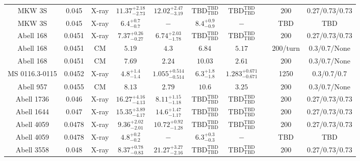 \begin{table}
\begin{tabular}{cccccccccc}
MKW 3S & 0.045 & X-ray & ${11.37}^{+2.18}_{-2.73}$ & ${12.02}^{+2.47}_{-3.19}$ & ${\mathrm{TBD}}^{\mathrm{TBD}}_{\mathrm{TBD}}$ & ${\mathrm{TBD}}^{\mathrm{TBD}}_{\mathrm{TBD}}$ & \citet{BA14.1} & 200 & 0.27/0.73/0.73 \\
MKW 3S & 0.045 & X-ray & ${6.4}^{+0.7}_{-0.7}$ & ${-}^{}_{}$ & ${8.4}^{+0.9}_{-0.9}$ & ${-}^{}_{}$ & \citet{XU01.1} & TBD & TBD \\
Abell 168 & 0.0451 & X-ray & ${7.37}^{+0.26}_{-0.27}$ & ${6.74}^{+2.03}_{-1.78}$ & ${\mathrm{TBD}}^{\mathrm{TBD}}_{\mathrm{TBD}}$ & ${\mathrm{TBD}}^{\mathrm{TBD}}_{\mathrm{TBD}}$ & \citet{BA14.1} & 200 & 0.27/0.73/0.73 \\
Abell 168 & 0.0451 & CM & ${5.19}^{}_{}$ & ${4.3}^{}_{}$ & ${6.84}^{}_{}$ & ${5.17}^{}_{}$ & \citet{RI03.1} & 200/turn & 0.3/0.7/None \\
Abell 168 & 0.0451 & CM & ${7.69}^{}_{}$ & ${2.24}^{}_{}$ & ${10.03}^{}_{}$ & ${2.61}^{}_{}$ & \citet{RI06.1} & 200 & 0.3/0.7/None \\
MS 0116.3-0115 & 0.0452 & X-ray & ${4.8}^{+1.4}_{-1.4}$ & ${1.055}^{+0.514}_{-0.514}$ & ${6.3}^{+1.8}_{-1.8}$ & ${1.283}^{+0.671}_{-0.671}$ & \citet{GA06.1} & 1250 & 0.3/0.7/0.7 \\
Abell 957 & 0.0455 & CM & ${8.13}^{}_{}$ & ${2.79}^{}_{}$ & ${10.6}^{}_{}$ & ${3.25}^{}_{}$ & \citet{RI06.1} & 200 & 0.3/0.7/None \\
Abell 1736 & 0.046 & X-ray & ${16.27}^{+4.16}_{-4.13}$ & ${8.11}^{+1.15}_{-1.18}$ & ${\mathrm{TBD}}^{\mathrm{TBD}}_{\mathrm{TBD}}$ & ${\mathrm{TBD}}^{\mathrm{TBD}}_{\mathrm{TBD}}$ & \citet{BA14.1} & 200 & 0.27/0.73/0.73 \\
Abell 1644 & 0.047 & X-ray & ${15.35}^{+3.89}_{-4.17}$ & ${14.6}^{+1.47}_{-1.17}$ & ${\mathrm{TBD}}^{\mathrm{TBD}}_{\mathrm{TBD}}$ & ${\mathrm{TBD}}^{\mathrm{TBD}}_{\mathrm{TBD}}$ & \citet{BA14.1} & 200 & 0.27/0.73/0.73 \\
Abell 4059 & 0.0478 & X-ray & ${9.36}^{+2.02}_{-2.01}$ & ${10.72}^{+0.92}_{-1.28}$ & ${\mathrm{TBD}}^{\mathrm{TBD}}_{\mathrm{TBD}}$ & ${\mathrm{TBD}}^{\mathrm{TBD}}_{\mathrm{TBD}}$ & \citet{BA14.1} & 200 & 0.27/0.73/0.73 \\
Abell 4059 & 0.0478 & X-ray & ${4.8}^{+0.2}_{-0.2}$ & ${-}^{}_{}$ & ${6.3}^{+0.3}_{-0.3}$ & ${-}^{}_{}$ & \citet{XU01.1} & TBD & TBD \\
Abell 3558 & 0.048 & X-ray & ${8.37}^{+0.78}_{-0.83}$ & ${21.27}^{+3.27}_{-2.16}$ & ${\mathrm{TBD}}^{\mathrm{TBD}}_{\mathrm{TBD}}$ & ${\mathrm{TBD}}^{\mathrm{TBD}}_{\mathrm{TBD}}$ & \citet{BA14.1} & 200 & 0.27/0.73/0.73 \\

\end{tabular}
\end{table}
